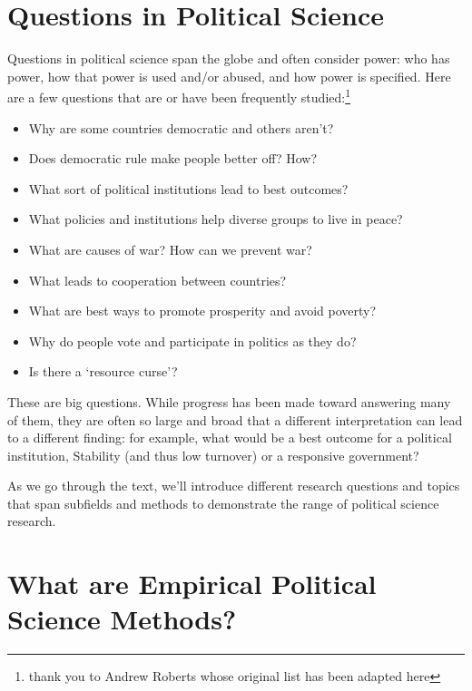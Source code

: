 \documentclass{book}
\begin{document}
\hypertarget{questions-in-political-science}{%
\section{Questions in Political
Science}\label{questions-in-political-science}}

Questions in political science span the globe and often consider power: who
has power, how that power is used and/or abused, and how power is specified.
Here are a few questions that are or have been frequently studied:\footnote{thank
  you to Andrew Roberts whose original list has been adapted here}

\begin{itemize}
\item
  Why are some countries democratic and others aren't?
\item
  Does democratic rule make people better off? How?
\item
  What sort of political institutions lead to best outcomes?
\item
  What policies and institutions help diverse groups to live in peace?
\item
  What are causes of war? How can we prevent war?
\item
  What leads to cooperation between countries?
\item
  What are best ways to promote prosperity and avoid poverty?
\item
  Why do people vote and participate in politics as they do?
\item
  Is there a `resource curse'?
\end{itemize}

These are big questions. While progress has been made toward answering many of
them, they are often so large and broad that a different interpretation can
lead to a different finding: for example, what would be a best outcome for a
political institution, Stability (and thus low turnover) or a responsive
government?

As we go through the text, we'll introduce different research questions and
topics that span subfields and methods to demonstrate the range of political
science research.

\hypertarget{what-are-empirical-political-science-methods}{%
\section{What are Empirical Political Science
Methods?}\label{what-are-empirical-political-science-methods}}
\end{document}
